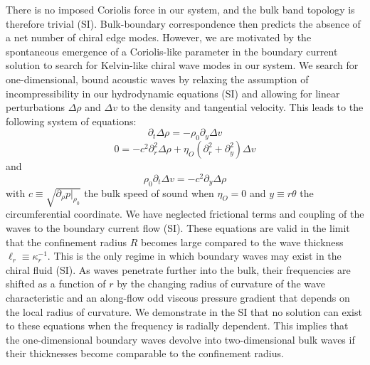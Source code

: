\documentclass[%
 reprint,
superscriptaddress,
longbibliography,
 amsmath,amssymb,
 prl,
 citeautoscript,
]{revtex4-1}
\begin{document}
There is no imposed Coriolis force in our system, and the bulk band topology is therefore trivial \cite{boundary_waves} (SI). Bulk-boundary correspondence then predicts the absence of a net number of chiral edge modes. However, we are motivated by the spontaneous emergence of a Coriolis-like parameter in the boundary current solution to search for Kelvin-like chiral wave modes in our system. We search for one-dimensional, bound acoustic waves by relaxing the assumption of incompressibility in our hydrodynamic equations (SI) and allowing for linear perturbations $\Delta \rho$ and $\Delta v$ to the density and tangential velocity. This leads to the following system of equations:
\begin{equation}
\partial_t \Delta \rho = - \rho_0 \partial_y \Delta v
\label{eqn:unsteady_continuity}
\end{equation}
\begin{equation}
0 = - c^2 \partial_r^2 \Delta \rho + \eta_O \left( \partial_r^2 + \partial_y^2 \right) \Delta v
\label{eqn:unsteady_xmom}
\end{equation}
and
\begin{equation}
\rho_0 \partial_t \Delta v = - c^2 \partial_y \Delta \rho
\label{eqn:unsteady_ymom}
\end{equation}
with $c \equiv \sqrt{\partial_{\rho} p|_{\rho_0}}$ the bulk speed of sound when $\eta_O = 0$ and $y \equiv r \theta$ the circumferential coordinate. We have neglected frictional terms and coupling of the waves to the boundary current flow (SI). These equations are valid in the limit that the confinement radius $R$ becomes large compared to the wave thickness $\ell_r \equiv \kappa_r^{-1}$. This is the only regime in which boundary waves may exist in the chiral fluid (SI). As waves penetrate further into the bulk, their frequencies are shifted as a function of $r$ by the changing radius of curvature of the wave characteristic and an along-flow odd viscous pressure gradient that depends on the local radius of curvature. We demonstrate in the SI that no solution can exist to these equations when the frequency is radially dependent. This implies that the one-dimensional boundary waves devolve into two-dimensional bulk waves if their thicknesses become comparable to the confinement radius.
\end{document}
